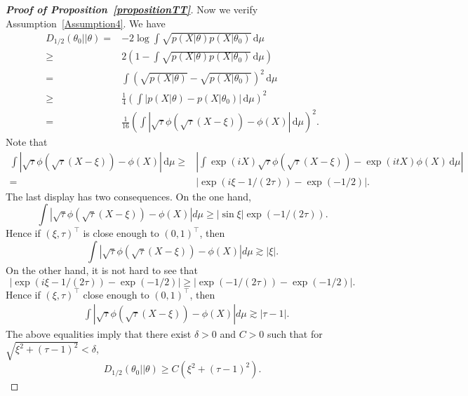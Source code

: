 \documentclass[11pt]{article}
\theoremstyle{plain}
\theoremstyle{definition}
\theoremstyle{remark}
\begin{document}
\begin{appendices}
\begin{proof}[\textbf{Proof of Proposition~\ref{propositionTT}}]
Now we verify Assumption~\ref{Assumption4}.
We have
\begin{equation*}
    \begin{split}
    D_{1/2}(\theta_0||\theta)
    =&-2\log \int \sqrt{p(X|\theta)p(X|\theta_0)} \, \mathrm  d\mu
    \\
    \geq&
    2\left(1-\int \sqrt{p(X|\theta)p(X|\theta_0)} \, \mathrm d\mu\right)
    \\
    =&\int \left(\sqrt{p(X|\theta)}-\sqrt{p(X|\theta_0)}\right)^2 \, \mathrm d\mu
    \\
    \geq&
    \frac{1}{4}
    \left(\int \left|p(X|\theta)-p(X|\theta_0)\right| \, \mathrm d\mu\right)^2
    \\
    =&
    \frac{1}{16}
    \left(\int \left|\sqrt{\tau}\phi(\sqrt{\tau}(X-\xi))-\phi(X)\right|   \, \mathrm  d\mu\right)^2
    .
\end{split}
\end{equation*}
Note that
\begin{equation*}
    \begin{split}
        \int \left|\sqrt{\tau}\phi(\sqrt{\tau}(X-\xi))-\phi(X)\right|\, \mathrm d\mu
    \geq &
    \left|\int  \exp(iX)\sqrt{\tau}\phi(\sqrt{\tau}(X-\xi))-\exp(itX)\phi(X) \, \mathrm d\mu\right|
    \\
    =&\left|\exp(i\xi -1 /(2\tau))-\exp(-1/2)\right|.
\end{split}
\end{equation*}
The last display has two consequences.
On the one hand,
\begin{equation*}
    \int \left|\sqrt{\tau}\phi(\sqrt{\tau}(X-\xi))-\phi(X)\right| d\mu
    \geq
    |\sin \xi |\exp(-1/(2\tau)).
\end{equation*}
Hence if $(\xi, \tau)^\top $ is close enough to $(0,1)^\top $, then
\begin{equation*}
    \int \left|\sqrt{\tau}\phi(\sqrt{\tau}(X-\xi))-\phi(X)\right| d\mu
    \gtrsim |\xi|.
\end{equation*}
On the other hand, 
it is not hard to see that
\begin{equation*}
    \left|\exp(i\xi -1/(2\tau))-\exp(-1/2)\right|
    \geq 
    \left|\exp(-1/(2\tau))-\exp(-1/2)\right|
    .
\end{equation*}
Hence if $(\xi, \tau)^\top $ close enough to $(0,1)^\top $, then
\begin{equation*}
    \begin{split}
        &\int \left|\sqrt{\tau}\phi(\sqrt{\tau}(X-\xi))-\phi(X)\right| d\mu
    \gtrsim |\tau-1|.
\end{split}
\end{equation*}
The above equalities imply that there exist $\delta>0$ and $C>0$ such that for $\sqrt{\xi^2+(\tau-1)^2}<\delta$,
\begin{equation*}
    D_{1/2}(\theta_0||\theta)\geq C (\xi^2+(\tau-1)^2).
\end{equation*}


\end{proof}
\end{appendices}
\end{document}
